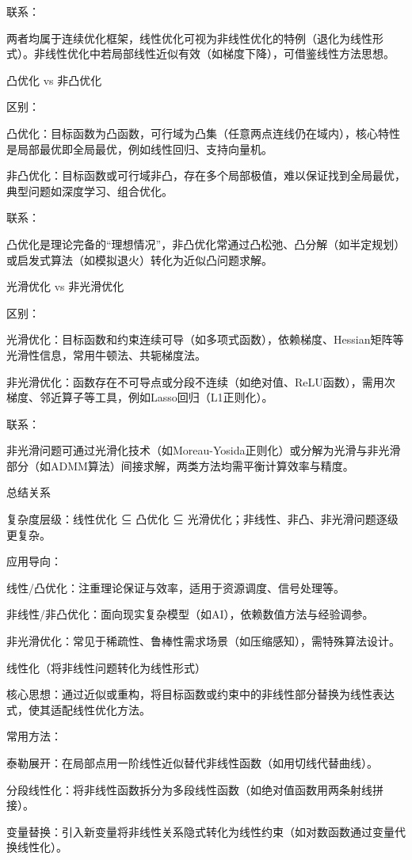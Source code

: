 \documentclass{article}
\begin{document}
	联系：
	
	两者均属于连续优化框架，线性优化可视为非线性优化的特例（退化为线性形式）。非线性优化中若局部线性近似有效（如梯度下降），可借鉴线性方法思想。
	
	凸优化 vs 非凸优化
	
	区别：
	
	凸优化：目标函数为凸函数，可行域为凸集（任意两点连线仍在域内），核心特性是局部最优即全局最优，例如线性回归、支持向量机。
	
	非凸优化：目标函数或可行域非凸，存在多个局部极值，难以保证找到全局最优，典型问题如深度学习、组合优化。
	
	联系：
	
	凸优化是理论完备的“理想情况”，非凸优化常通过凸松弛、凸分解（如半定规划）或启发式算法（如模拟退火）转化为近似凸问题求解。
	
	光滑优化 vs 非光滑优化
	
	区别：
	
	光滑优化：目标函数和约束连续可导（如多项式函数），依赖梯度、Hessian矩阵等光滑性信息，常用牛顿法、共轭梯度法。
	
	非光滑优化：函数存在不可导点或分段不连续（如绝对值、ReLU函数），需用次梯度、邻近算子等工具，例如Lasso回归（L1正则化）。
	
	联系：
	
	非光滑问题可通过光滑化技术（如Moreau-Yosida正则化）或分解为光滑与非光滑部分（如ADMM算法）间接求解，两类方法均需平衡计算效率与精度。
	
	总结关系
	
	复杂度层级：线性优化 ⊆ 凸优化 ⊆ 光滑优化；非线性、非凸、非光滑问题逐级更复杂。
	
	应用导向：
	
	线性/凸优化：注重理论保证与效率，适用于资源调度、信号处理等。
	
	非线性/非凸优化：面向现实复杂模型（如AI），依赖数值方法与经验调参。
	
	非光滑优化：常见于稀疏性、鲁棒性需求场景（如压缩感知），需特殊算法设计。
	
	线性化（将非线性问题转化为线性形式）
	
	核心思想：通过近似或重构，将目标函数或约束中的非线性部分替换为线性表达式，使其适配线性优化方法。
	
	常用方法：
	
	泰勒展开：在局部点用一阶线性近似替代非线性函数（如用切线代替曲线）。
	
	分段线性化：将非线性函数拆分为多段线性函数（如绝对值函数用两条射线拼接）。
	
	变量替换：引入新变量将非线性关系隐式转化为线性约束（如对数函数通过变量代换线性化）。
	
\end{document}
